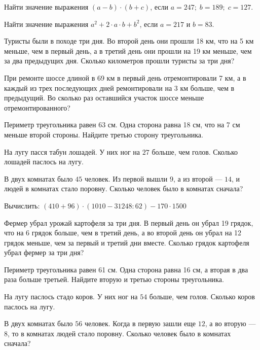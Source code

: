 \begin{class}[number=2]
	\begin{listofex}
	\item Найти значение выражения \( (a-b)\cdot(b+c) \), если \( a=247;\; b=189;\; c=127 \).
	\item Найти значение выражения \( a^2+2\cdot a\cdot b + b^2 \), если \( a=217 \) и \( b=83 \).
	\item Туристы были в походе три дня. Во второй день они прошли 18 км, что на 5 км меньше,
	чем в первый день, а в третий день они прошли на 19 км меньше, чем за два предыдущих дня.
	Сколько километров прошли туристы за три дня?
	\item При ремонте шоссе длиной в 69 км в первый день отремонтировали 7 км, а в каждый из
	трех последующих дней ремонтировали на 3 км больше, чем в предыдущий. Во сколько раз
	оставшийся участок шоссе меньше отремонтированного?
	\item Периметр треугольника равен 63 см. Одна сторона равна 18 см, что на 7 см меньше второй стороны. Найдите третью сторону треугольника.
	\item На лугу пасся табун лошадей. У них ног на \( 27 \) больше, чем голов. Сколько лошадей паслось на лугу.
	\item В двух комнатах было \( 45 \) человек. Из первой вышли \( 9 \), а из второй --- \( 14 \), и людей в комнатах стало поровну. Сколько человек было в комнатах сначала?
	\end{listofex}
\end{class}

\begin{homework}[number=1]
	\begin{listofex}
	\item Вычислить: \( (410+96)\cdot(1010-31248:62)-170\cdot1500 \)
	\item Фермер убрал урожай картофеля за три дня. В первый день он убрал 19 грядок, что на 6 грядок больше, чем в третий день, а во второй день он убрал на 12 грядок меньше, чем за первый и третий дни вместе. Сколько грядок картофеля убрал фермер за три дня?
	\item Периметр треугольника равен 61 см. Одна сторона равна 16 см, а вторая в два раза больше третьей. Найдите вторую и третью стороны треугольника.
	\item На лугу паслось стадо коров. У них ног на \( 54 \) больше, чем голов. Сколько коров паслось на лугу.
	\item В двух комнатах было \( 56 \) человек. Когда в первую зашли еще \( 12 \), а во вторую --- \( 8 \), то в комнатах людей стало поровну. Сколько человек было в комнатах сначала?
	\end{listofex}
\end{homework}

